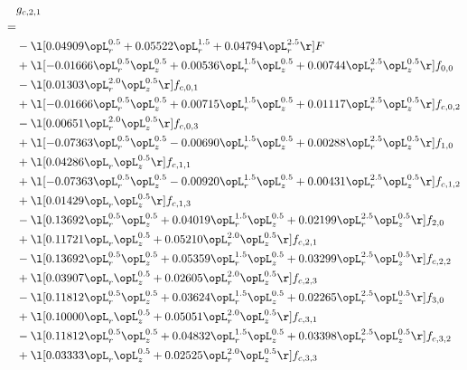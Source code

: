 \begin{alignat}{2} 
\label{eq:g_21_0} 
& g_{c,2,1} \nonumber \\ 
 = \\ 
& - \l[  0.04909 \opL_r^{0.5} +  0.05522 \opL_r^{1.5} +  0.04794 \opL_r^{2.5}  \r] F \nonumber \\ 
& + \l[  -0.01666 \opL_r^{0.5} \opL_z^{0.5} +  0.00536 \opL_r^{1.5} \opL_z^{0.5} +  0.00744 \opL_r^{2.5} \opL_z^{0.5}  \r] f_{0,0} \nonumber \\ 
& - \l[  0.01303 \opL_r^{2.0} \opL_z^{0.5}  \r] f_{c,0,1} \nonumber \\ 
& + \l[  -0.01666 \opL_r^{0.5} \opL_z^{0.5} +  0.00715 \opL_r^{1.5} \opL_z^{0.5} +  0.01117 \opL_r^{2.5} \opL_z^{0.5}  \r] f_{c,0,2} \nonumber \\ 
& - \l[  0.00651 \opL_r^{2.0} \opL_z^{0.5}  \r] f_{c,0,3} \nonumber \\ 
& + \l[  -0.07363 \opL_r^{0.5} \opL_z^{0.5}   -0.00690 \opL_r^{1.5} \opL_z^{0.5} +  0.00288 \opL_r^{2.5} \opL_z^{0.5}  \r] f_{1,0} \nonumber \\ 
& + \l[  0.04286 \opL_r \opL_z^{0.5}  \r] f_{c,1,1} \nonumber \\ 
& + \l[  -0.07363 \opL_r^{0.5} \opL_z^{0.5}   -0.00920 \opL_r^{1.5} \opL_z^{0.5} +  0.00431 \opL_r^{2.5} \opL_z^{0.5}  \r] f_{c,1,2} \nonumber \\ 
& + \l[  0.01429 \opL_r \opL_z^{0.5}  \r] f_{c,1,3} \nonumber \\ 
& - \l[  0.13692 \opL_r^{0.5} \opL_z^{0.5} +  0.04019 \opL_r^{1.5} \opL_z^{0.5} +  0.02199 \opL_r^{2.5} \opL_z^{0.5}  \r] f_{2,0} \nonumber \\ 
& + \l[  0.11721 \opL_r \opL_z^{0.5} +  0.05210 \opL_r^{2.0} \opL_z^{0.5}  \r] f_{c,2,1} \nonumber \\ 
& - \l[  0.13692 \opL_r^{0.5} \opL_z^{0.5} +  0.05359 \opL_r^{1.5} \opL_z^{0.5} +  0.03299 \opL_r^{2.5} \opL_z^{0.5}  \r] f_{c,2,2} \nonumber \\ 
& + \l[  0.03907 \opL_r \opL_z^{0.5} +  0.02605 \opL_r^{2.0} \opL_z^{0.5}  \r] f_{c,2,3} \nonumber \\ 
& - \l[  0.11812 \opL_r^{0.5} \opL_z^{0.5} +  0.03624 \opL_r^{1.5} \opL_z^{0.5} +  0.02265 \opL_r^{2.5} \opL_z^{0.5}  \r] f_{3,0} \nonumber \\ 
& + \l[  0.10000 \opL_r \opL_z^{0.5} +  0.05051 \opL_r^{2.0} \opL_z^{0.5}  \r] f_{c,3,1} \nonumber \\ 
& - \l[  0.11812 \opL_r^{0.5} \opL_z^{0.5} +  0.04832 \opL_r^{1.5} \opL_z^{0.5} +  0.03398 \opL_r^{2.5} \opL_z^{0.5}  \r] f_{c,3,2} \nonumber \\ 
& + \l[  0.03333 \opL_r \opL_z^{0.5} +  0.02525 \opL_r^{2.0} \opL_z^{0.5}  \r] f_{c,3,3} \nonumber \\ 
\end{alignat} 


